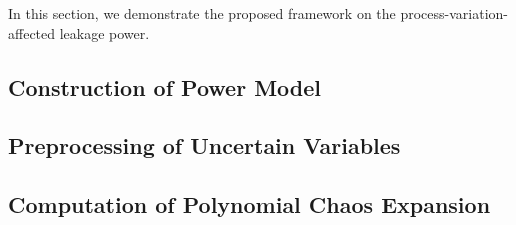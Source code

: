 In this section, we demonstrate the proposed framework on the process-variation-affected leakage power.

\subsection{Construction of Power Model} 


\subsection{Preprocessing of Uncertain Variables} 


\subsection{Computation of Polynomial Chaos Expansion} 

